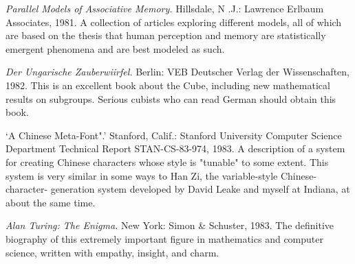  {\sl Parallel Models of Associative Memory.} Hillsdale, N .J.: Lawrence Erlbaum Associates, 1981. A collection of articles exploring different models, all of which are based on the thesis that human perception and memory are statistically emergent phenomena and are best modeled as such.

 {\sl Der Ungarische Zauberwiirfel.} Berlin: VEB Deutscher Verlag der Wissenschaften, 1982. This is an excellent book about the Cube, including new mathematical results on subgroups. Serious cubists who can read German should obtain this book.

 `A Chinese Meta-Font".' Stanford, Calif.: Stanford University Computer Science Department Technical Report STAN-CS-83-974, 1983. A description of a system for creating Chinese characters whose style is "tunable" to some extent. This system is very similar in some ways to Han Zi, the variable-style Chinese-character- generation system developed by David Leake and myself at Indiana, at about the same time.

 {\sl Alan Turing: The Enigma.} New York: Simon \& Schuster, 1983. The definitive biography of this extremely important figure in mathematics and computer science, written with empathy, insight, and charm.

